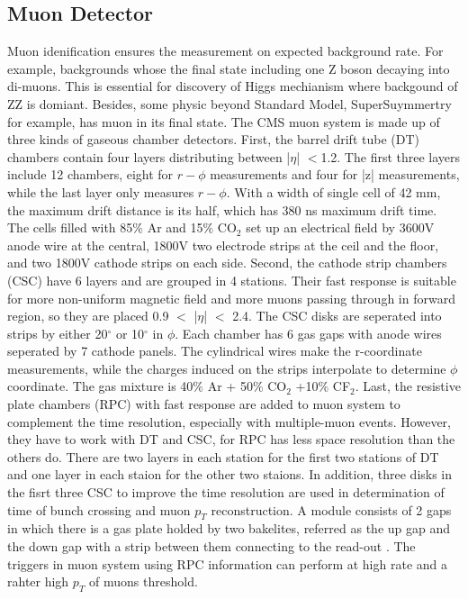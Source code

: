 \subsection{Muon Detector} 
Muon idenification ensures the measurement on expected background rate. 
For example, backgrounds whose the final state including one Z boson decaying into di-muons. 
This is essential for discovery of Higgs mechianism where backgound of ZZ is domiant.
Besides, some physic beyond Standard Model, SuperSuymmertry for example, has muon in its final state.
The CMS muon system is made up of three kinds of gaseous chamber detectors. 
First, the barrel drift tube (DT) chambers contain four layers distributing between |$\eta $| $<$1.2.
The first three layers include 12 chambers, eight for $r-\phi$ measurements and four for |z| measurements, while the last layer only measures $r-\phi$. 
With a width of single cell of 42 mm, the maximum drift distance is its half, which has 380 ns maximum drift time. 
The cells filled with 85$\% $ Ar and 15$\% $ CO$_2$ set up an electrical field by 3600V anode wire at the central, 1800V two electrode strips at the ceil and the floor, and two  1800V cathode strips on each side. 
Second, the cathode strip chambers (CSC) have 6 layers and are grouped in 4 stations.
Their fast response is suitable for more non-uniform magnetic field and more muons passing through in forward region, so they are placed 0.9 $<$ |$\eta $| $<$ 2.4.
The CSC disks are seperated into strips by either 20$^{\circ} $ or 10$^{\circ} $ in $\phi $. 
Each chamber has 6 gas gaps with anode wires seperated by 7 cathode panels. 
The cylindrical wires make the r-coordinate measurements, while the charges induced on the strips interpolate to determine $\phi $ coordinate.
The gas mixture is 40$\% $ Ar + 50$\% $ CO$_2$ +10$\% $ CF$_2$. 
Last, the resistive plate chambers (RPC) with fast response are added to muon system to complement the time resolution, especially with multiple-muon events.
However, they have to work with DT and CSC, for RPC has less space resolution than the others do.
There are two layers in each station for the first two stations of DT and one layer in each staion for the other two staions. 
In addition, three disks in the fisrt three CSC to improve the time resolution are used in determination of time of bunch crossing and muon $p_T$ reconstruction.
A module consists of 2 gaps in which there is a gas plate holded by two bakelites, referred as the up gap and the down gap with a strip between them connecting to the read-out .
The triggers in muon system using RPC information can perform at high rate and a rahter high $p_{T}$ of muons threshold.

